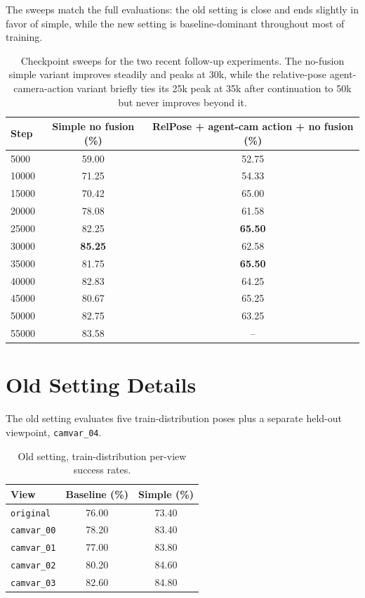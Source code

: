 \documentclass[11pt]{article}
\begin{document}
The sweeps match the full evaluations: the old setting is close and ends slightly in favor of simple, while the new setting is baseline-dominant throughout most of training.

\begin{table}[p]
\centering
\small
\begin{tabular}{lcc}
\toprule
\textbf{Step} & \textbf{Simple no fusion (\%)} & \textbf{RelPose + agent-cam action + no fusion (\%)} \\
\midrule
5000 & 59.00 & 52.75 \\
10000 & 71.25 & 54.33 \\
15000 & 70.42 & 65.00 \\
20000 & 78.08 & 61.58 \\
25000 & 82.25 & \textbf{65.50} \\
30000 & \textbf{85.25} & 62.58 \\
35000 & 81.75 & \textbf{65.50} \\
40000 & 82.83 & 64.25 \\
45000 & 80.67 & 65.25 \\
50000 & 82.75 & 63.25 \\
55000 & 83.58 & -- \\
\bottomrule
\end{tabular}
\caption{Checkpoint sweeps for the two recent follow-up experiments. The no-fusion simple variant improves steadily and peaks at 30k, while the relative-pose agent-camera-action variant briefly ties its 25k peak at 35k after continuation to 50k but never improves beyond it.}
\label{tab:cam_followup_curve}
\end{table}

\section{Old Setting Details}
The old setting evaluates five train-distribution poses plus a separate held-out viewpoint, \texttt{camvar\_04}.

\begin{table}[h]
\centering
\small
\begin{tabular}{lcc}
\toprule
\textbf{View} & \textbf{Baseline (\%)} & \textbf{Simple (\%)} \\
\midrule
\texttt{original} & 76.00 & 73.40 \\
\texttt{camvar\_00} & 78.20 & 83.40 \\
\texttt{camvar\_01} & 77.00 & 83.80 \\
\texttt{camvar\_02} & 80.20 & 84.60 \\
\texttt{camvar\_03} & 82.60 & 84.80 \\
\bottomrule
\end{tabular}
\caption{Old setting, train-distribution per-view success rates.}
\label{tab:cam_old_pose}
\end{table}
\end{document}
